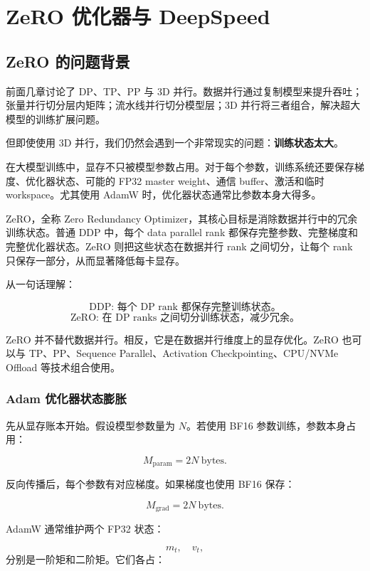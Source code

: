 \chapter{ZeRO 优化器与 DeepSpeed}
\label{chap:zero-deepspeed}

\section{ZeRO 的问题背景}
\label{sec:zero-background}

前面几章讨论了 DP、TP、PP 与 3D 并行。数据并行通过复制模型来提升吞吐；张量并行切分层内矩阵；流水线并行切分模型层；3D 并行将三者组合，解决超大模型的训练扩展问题。

但即使使用 3D 并行，我们仍然会遇到一个非常现实的问题：\textbf{训练状态太大}。

在大模型训练中，显存不只被模型参数占用。对于每个参数，训练系统还要保存梯度、优化器状态、可能的 FP32 master weight、通信 buffer、激活和临时 workspace。尤其使用 AdamW 时，优化器状态通常比参数本身大得多。

ZeRO，全称 Zero Redundancy Optimizer，其核心目标是消除数据并行中的冗余训练状态。普通 DDP 中，每个 data parallel rank 都保存完整参数、完整梯度和完整优化器状态。ZeRO 则把这些状态在数据并行 rank 之间切分，让每个 rank 只保存一部分，从而显著降低每卡显存。

从一句话理解：

\[
\text{DDP: 每个 DP rank 都保存完整训练状态。}
\]
\[
\text{ZeRO: 在 DP ranks 之间切分训练状态，减少冗余。}
\]

ZeRO 并不替代数据并行。相反，它是在数据并行维度上的显存优化。ZeRO 也可以与 TP、PP、Sequence Parallel、Activation Checkpointing、CPU/NVMe Offload 等技术组合使用。

\subsection{Adam 优化器状态膨胀}
\label{subsec:adam-state-explosion}

先从显存账本开始。假设模型参数量为 $N$。若使用 BF16 参数训练，参数本身占用：

\[
M_{\mathrm{param}}=2N\ \mathrm{bytes}.
\]

反向传播后，每个参数有对应梯度。如果梯度也使用 BF16 保存：

\[
M_{\mathrm{grad}}=2N\ \mathrm{bytes}.
\]

AdamW 通常维护两个 FP32 状态：

\[
m_t,\quad v_t,
\]
分别是一阶矩和二阶矩。它们各占：

